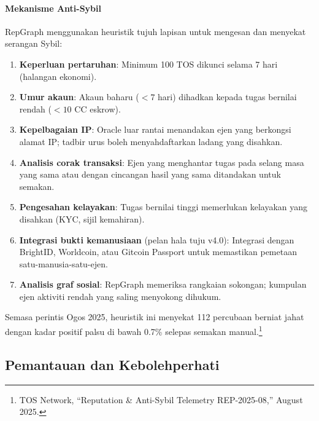 \documentclass[11pt]{article}
\begin{document}
\paragraph{Mekanisme Anti-Sybil} RepGraph menggunakan heuristik tujuh lapisan untuk mengesan dan menyekat serangan Sybil:
\begin{enumerate}[noitemsep]
  \item \textbf{Keperluan pertaruhan}: Minimum 100 TOS dikunci selama 7 hari (halangan ekonomi).
  \item \textbf{Umur akaun}: Akaun baharu ($<7$ hari) dihadkan kepada tugas bernilai rendah ($<10$ CC eskrow).
  \item \textbf{Kepelbagaian IP}: Oracle luar rantai menandakan ejen yang berkongsi alamat IP; tadbir urus boleh menyahdaftarkan ladang yang disahkan.
  \item \textbf{Analisis corak transaksi}: Ejen yang menghantar tugas pada selang masa yang sama atau dengan cincangan hasil yang sama ditandakan untuk semakan.
  \item \textbf{Pengesahan kelayakan}: Tugas bernilai tinggi memerlukan kelayakan yang disahkan (KYC, sijil kemahiran).
  \item \textbf{Integrasi bukti kemanusiaan} (pelan hala tuju v4.0): Integrasi dengan BrightID, Worldcoin, atau Gitcoin Passport untuk memastikan pemetaan satu-manusia-satu-ejen.
  \item \textbf{Analisis graf sosial}: RepGraph memeriksa rangkaian sokongan; kumpulan ejen aktiviti rendah yang saling menyokong dihukum.
\end{enumerate}
Semasa perintis Ogos 2025, heuristik ini menyekat 112 percubaan berniat jahat dengan kadar positif palsu di bawah 0.7\% selepas semakan manual.\footnote{TOS Network, ``Reputation \& Anti-Sybil Telemetry REP-2025-08,'' August 2025.}

\subsection{Pemantauan dan Kebolehperhati}
\end{document}

